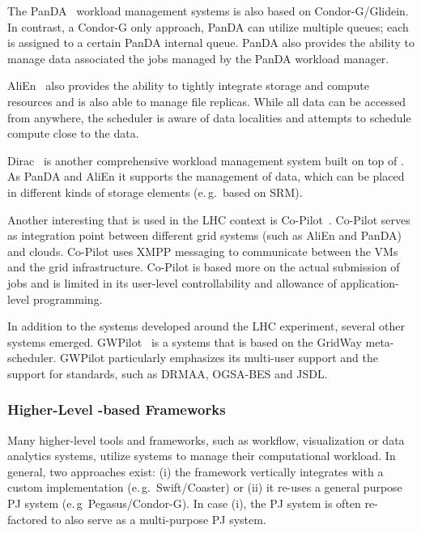 \documentclass{sig-alternate}
\begin{document}
The PanDA~\cite{1742-6596-331-7-072069} workload management systems is also 
based on Condor-G/Glidein. In contrast, a Condor-G only approach,
PanDA can utilize multiple queues; each \pilot is assigned to a certain PanDA
internal queue. PanDA also provides the ability to manage data associated the 
jobs managed by the PanDA workload manager.

AliEn~\cite{1742-6596-119-6-062012} also provides the ability to tightly 
integrate storage and compute resources and is also able to manage file 
replicas. While all data can be accessed from anywhere, the scheduler is aware 
of data localities and attempts to schedule compute close to the data.

Dirac~\cite{1742-6596-219-6-062049} is another comprehensive workload
management system built on top of \pilots. As PanDA and AliEn it supports the
management of data, which can be placed in different kinds of storage elements
(e.\,g.\ based on SRM).

Another interesting \pilot that is used in the LHC context is
Co-Pilot~\cite{copilot-tr}. Co-Pilot serves as integration point between
different grid \pilotjob systems (such as AliEn and PanDA) and clouds.
Co-Pilot uses XMPP messaging to communicate between the VMs and the grid
infrastructure. Co-Pilot is based more on the actual submission of jobs and is
limited in its user-level controllability and allowance of application-level
programming.

In addition to the \pilotjob systems developed around the LHC experiment, 
several other systems emerged. GWPilot~\cite{gwpilot} is a \pilot systems that 
is based on the GridWay meta-scheduler. GWPilot particularly emphasizes its 
multi-user support and the support for standards, such as DRMAA, OGSA-BES and 
JSDL.

\subsubsection*{Higher-Level \pilot-based Frameworks}

Many higher-level tools and frameworks, such as workflow,
visualization or data analytics systems, utilize \pilotjob systems to
manage their computational workload. In general, two approaches exist:
(i) the framework vertically integrates with a custom \pilotjob
implementation (e.\,g.\ Swift/Coaster) or (ii) it re-uses a general
purpose PJ system (e.\,g\ Pegasus/Condor-G). In case (i), the PJ
system is often re-factored to also serve as a multi-purpose PJ
system. 
\end{document}
